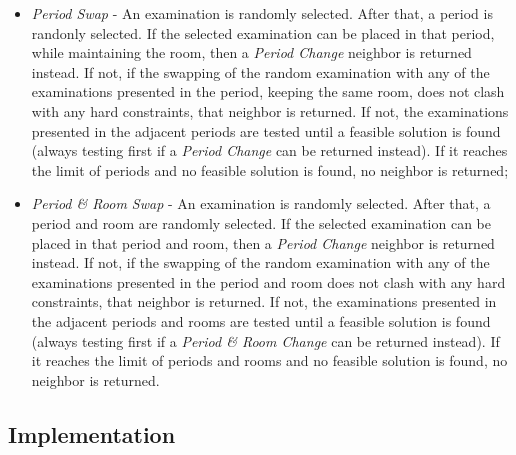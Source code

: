 \begin{itemize}
	\item \textit{Period Swap} -  An examination is randomly selected. After that, a period is randonly selected. If the selected examination can be placed in that period, while maintaining the room, then a \textit{Period Change} neighbor is returned instead. If not, if the swapping of the random examination with any of the examinations presented in the period, keeping the same room, does not clash with any hard constraints, that neighbor is returned. If not, the examinations presented in the adjacent periods are tested until a feasible solution is found (always testing first if a \textit{Period Change} can be returned instead). If it reaches the limit of periods and no feasible solution is found, no neighbor is returned;\\
	
	\item \textit{Period \& Room Swap} - An examination is randomly selected. After that, a period and room are randomly selected. If the selected examination can be placed in that period and room, then a \textit{Period Change} neighbor is returned instead. If not, if the swapping of the random examination with any of the examinations presented in the period and room does not clash with any hard constraints, that neighbor is returned. If not, the examinations presented in the adjacent periods and rooms are tested until a feasible solution is found (always testing first if a \textit{Period \& Room Change} can be returned instead). If it reaches the limit of periods and rooms and no feasible solution is found, no neighbor is returned.
\end{itemize}

\subsection{Implementation}

